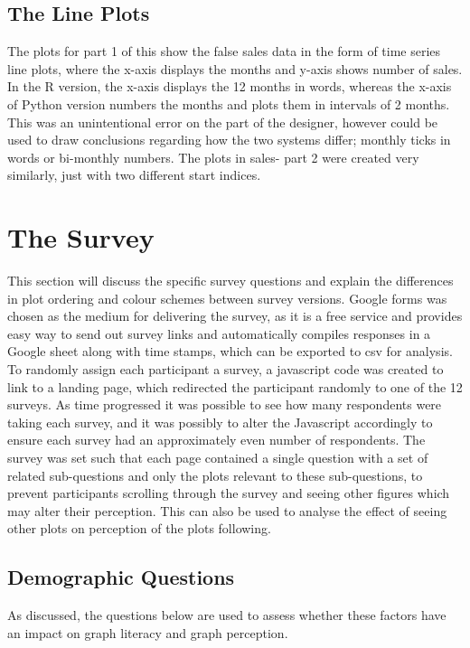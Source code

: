 \documentclass[
  11pt,
]{book}
\begin{document}
\subsection{The Line Plots}

The plots for part 1 of this show the false sales data in the form of
time series line plots, where the x-axis displays the months and y-axis
shows number of sales. In the R version, the x-axis displays the 12
months in words, whereas the x-axis of Python version numbers the months
and plots them in intervals of 2 months. This was an unintentional error
on the part of the designer, however could be used to draw conclusions
regarding how the two systems differ; monthly ticks in words or
bi-monthly numbers. The plots in sales- part 2 were created very
similarly, just with two different start indices.

\section{The Survey}

This section will discuss the specific survey questions and explain the
differences in plot ordering and colour schemes between survey versions.
Google forms was chosen as the medium for delivering the survey, as it
is a free service and provides easy way to send out survey links and
automatically compiles responses in a Google sheet along with time
stamps, which can be exported to csv for analysis. To randomly assign
each participant a survey, a javascript code was created to link to a
landing page, which redirected the participant randomly to one of the 12
surveys. As time progressed it was possible to see how many respondents
were taking each survey, and it was possibly to alter the Javascript
accordingly to ensure each survey had an approximately even number of
respondents. The survey was set such that each page contained a single
question with a set of related sub-questions and only the plots relevant
to these sub-questions, to prevent participants scrolling through the
survey and seeing other figures which may alter their perception. This
can also be used to analyse the effect of seeing other plots on
perception of the plots following.

\subsection{Demographic Questions}

As discussed, the questions below are used to assess whether these
factors have an impact on graph literacy and graph perception.
\end{document}
